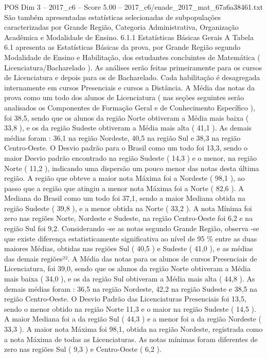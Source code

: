 \begin{textsample}{POS Dim 3 – 2017\_c6 – Score 5.00 – 2017\_c6/enade\_2017\_mat\_67a6a38461.txt}
São também apresentadas estatísticas selecionadas de subpopulações caracterizadas por Grande Região, Categoria Administrativa, Organização Acadêmica e Modalidade de Ensino. 6.1.1 Estatísticas Básicas Gerais A Tabela 6.1 apresenta as Estatísticas Básicas da prova, por Grande Região segundo Modalidade de Ensino e Habilitação, dos estudantes concluintes de Matemática ( Licenciatura/Bacharelado ).
As análises serão feitas primeiramente para os cursos de Licenciatura e depois para os de Bacharelado.
Cada habilitação é desagregada internamente em cursos Presenciais e cursos a Distância.
A Média das notas da prova como um todo dos alunos de Licenciatura ( nas seções seguintes serão analisados os Componentes de Formação Geral e de Conhecimento Específico ), foi 38,5, sendo que os alunos da região Norte obtiveram a Média mais baixa ( 33,8 ), e os da região Sudeste obtiveram a Média mais alta ( 41,1 ).
As demais médias foram : 36,1 na região Nordeste, 40,5 na região Sul e 38,3 na região Centro-Oeste.
O Desvio padrão para o Brasil como um todo foi 13,3, sendo o maior Desvio padrão encontrado na região Sudeste ( 14,3 ) e o menor, na região Norte ( 11,2 ), indicando uma dispersão um pouco menor das notas desta última região.
A região que obteve a maior nota Máxima foi a Nordeste ( 98,1 ), ao passo que a região que atingiu a menor nota Máxima foi a Norte ( 82,6 ).
A Mediana do Brasil como um todo foi 37,1, sendo a maior Mediana obtida na região Sudeste ( 39,8 ), e a menor obtida na Norte ( 33,2 ).
A nota Mínima foi zero nas regiões Norte, Nordeste e Sudeste, na região Centro-Oeste foi 6,2 e na região Sul foi 9,2.
Considerando -se as notas segundo Grande Região, observa -se que existe diferença estatisticamente significativa ao nível de 95 \% entre as duas maiores Médias, obtidas nas regiões Sul ( 40,5 ) e Sudeste ( 41,0 ), e as médias das demais regiões²².
A Média das notas para os alunos de cursos Presenciais de Licenciatura, foi 39,0, sendo que os alunos da região Norte obtiveram a Média mais baixa ( 34,0 ), e os da região Sul obtiveram a Média mais alta ( 44,8 ).
As demais médias foram : 36,5 na região Nordeste, 42,2 na região Sudeste e 38,5 na região Centro-Oeste.
O Desvio Padrão das Licenciaturas Presenciais foi 13,5, sendo o menor obtido na região Norte 11,3 e o maior na região Sudeste ( 14,5 ).
A maior Mediana foi a da região Sul ( 44,3 ) e a menor foi a da região Nordeste ( 33,3 ).
A maior nota Máxima foi 98,1, obtida na região Nordeste, registrada como a nota Máxima de todas as Licenciaturas.
As notas mínimas foram diferentes de zero nas regiões Sul ( 9,3 ) e Centro-Oeste ( 6,2 ).

\end{textsample}
